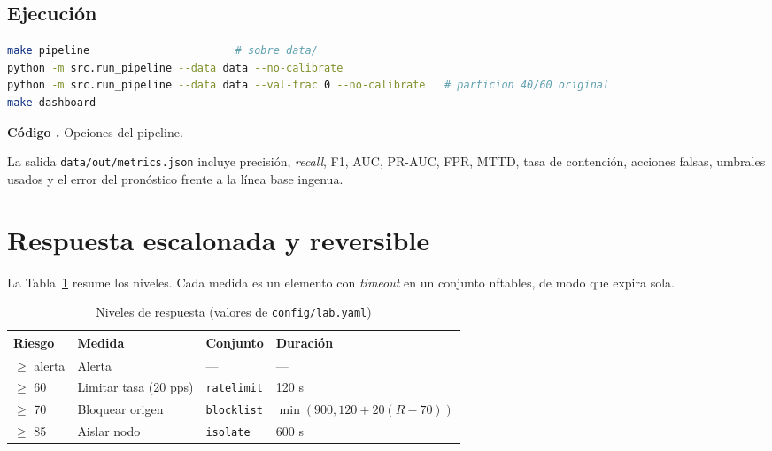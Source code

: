 \documentclass[conference,onecolumn]{IEEEtran}
\newcommand{\cmd}[1]{\texttt{#1}}
\newcounter{codigo}
\newcommand{\codigo}[2]{\par\refstepcounter{codigo}\label{#2}{\footnotesize\textbf{Código \thecodigo.} #1}\par\nopagebreak}
\begin{document}
\subsection{Ejecución}
\begin{lstlisting}[language=bash]
make pipeline                       # sobre data/
python -m src.run_pipeline --data data --no-calibrate
python -m src.run_pipeline --data data --val-frac 0 --no-calibrate   # particion 40/60 original
make dashboard
\end{lstlisting}
\codigo{Opciones del pipeline.}{cod:pipe}
La salida \cmd{data/out/metrics.json} incluye precisión, \emph{recall}, F1, AUC, PR-AUC, FPR, MTTD, tasa de contención, acciones falsas, umbrales usados y el error del pronóstico frente a la línea base ingenua.

\section{Respuesta escalonada y reversible}
La Tabla~\ref{tab:resp} resume los niveles. Cada medida es un elemento con \emph{timeout} en un conjunto nftables, de modo que expira sola.

\begin{table}[htbp]
\centering
\caption{Niveles de respuesta (valores de \cmd{config/lab.yaml})}
\label{tab:resp}
\footnotesize
\begin{tabular}{@{}llll@{}}
\toprule
Riesgo & Medida & Conjunto & Duración \\
\midrule
$\ge$ alerta & Alerta & --- & --- \\
$\ge$ 60 & Limitar tasa (20 pps) & \cmd{ratelimit} & 120 s \\
$\ge$ 70 & Bloquear origen & \cmd{blocklist} & $\min(900,120+20(R-70))$ \\
$\ge$ 85 & Aislar nodo & \cmd{isolate} & 600 s \\
\bottomrule
\end{tabular}
\end{table}
\end{document}
